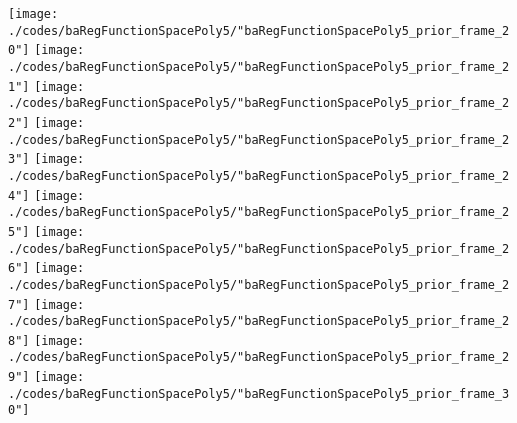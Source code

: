 \begin{frame}{\insertsection}
\begin{center}
{\begin{animateinline}{15}
				 \texttt{[image: ./codes/baRegFunctionSpacePoly5/"baRegFunctionSpacePoly5\_prior\_frame\_20"]}\newframe
				 \texttt{[image: ./codes/baRegFunctionSpacePoly5/"baRegFunctionSpacePoly5\_prior\_frame\_21"]}\newframe
				 \texttt{[image: ./codes/baRegFunctionSpacePoly5/"baRegFunctionSpacePoly5\_prior\_frame\_22"]}\newframe
				 \texttt{[image: ./codes/baRegFunctionSpacePoly5/"baRegFunctionSpacePoly5\_prior\_frame\_23"]}\newframe
				 \texttt{[image: ./codes/baRegFunctionSpacePoly5/"baRegFunctionSpacePoly5\_prior\_frame\_24"]}\newframe
				 \texttt{[image: ./codes/baRegFunctionSpacePoly5/"baRegFunctionSpacePoly5\_prior\_frame\_25"]}\newframe
				 \texttt{[image: ./codes/baRegFunctionSpacePoly5/"baRegFunctionSpacePoly5\_prior\_frame\_26"]}\newframe
				 \texttt{[image: ./codes/baRegFunctionSpacePoly5/"baRegFunctionSpacePoly5\_prior\_frame\_27"]}\newframe
				 \texttt{[image: ./codes/baRegFunctionSpacePoly5/"baRegFunctionSpacePoly5\_prior\_frame\_28"]}\newframe
				 \texttt{[image: ./codes/baRegFunctionSpacePoly5/"baRegFunctionSpacePoly5\_prior\_frame\_29"]}\newframe
				 \texttt{[image: ./codes/baRegFunctionSpacePoly5/"baRegFunctionSpacePoly5\_prior\_frame\_30"]}
			 \end{animateinline}
			}
	\end{center}
    
\end{frame}

